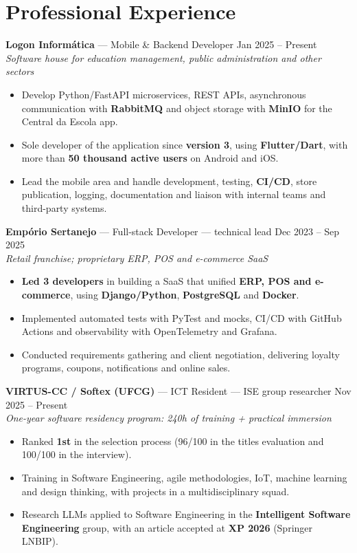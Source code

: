 \documentclass[10.5pt,a4paper]{article}
\newcommand{\cargo}[4]{%
  \Needspace*{5\baselineskip}%
  \textbf{#1} \textnormal{---} #2 \hfill \textnormal{#3}\\
  \textit{\small #4}\vspace{0.4ex}
}
\begin{document}
\section*{Professional Experience}

\cargo{Logon Informática}{Mobile \& Backend Developer}{Jan 2025 -- Present}{Software house for
education management, public administration and other sectors}
\begin{itemize}
  \item Develop Python/FastAPI microservices, REST APIs, asynchronous communication with
        \textbf{RabbitMQ} and object storage with \textbf{MinIO} for the Central da Escola app.
  \item Sole developer of the application since \textbf{version 3}, using \textbf{Flutter/Dart},
        with more than \textbf{50 thousand active users} on Android and iOS.
  \item Lead the mobile area and handle development, testing, \textbf{CI/CD}, store publication,
        logging, documentation and liaison with internal teams and third-party systems.
\end{itemize}

\cargo{Empório Sertanejo}{Full-stack Developer --- technical lead}{Dec 2023 -- Sep 2025}{Retail
franchise; proprietary ERP, POS and e-commerce SaaS}
\begin{itemize}
  \item \textbf{Led 3 developers} in building a SaaS that unified \textbf{ERP, POS and e-commerce},
        using \textbf{Django/Python}, \textbf{PostgreSQL} and \textbf{Docker}.
  \item Implemented automated tests with PyTest and mocks, CI/CD with GitHub Actions and
        observability with OpenTelemetry and Grafana.
  \item Conducted requirements gathering and client negotiation, delivering loyalty programs,
        coupons, notifications and online sales.
\end{itemize}

\cargo{VIRTUS-CC / Softex (UFCG)}{ICT Resident --- ISE group researcher}{Nov 2025 --
Present}{One-year software residency program: 240h of training + practical immersion}
\begin{itemize}
  \item Ranked \textbf{1st} in the selection process (96/100 in the titles evaluation and 100/100
        in the interview).
  \item Training in Software Engineering, agile methodologies, IoT, machine learning and design
        thinking, with projects in a multidisciplinary squad.
  \item Research LLMs applied to Software Engineering in the \textbf{Intelligent Software
        Engineering} group, with an article accepted at \textbf{XP 2026} (Springer LNBIP).
\end{itemize}
\end{document}
